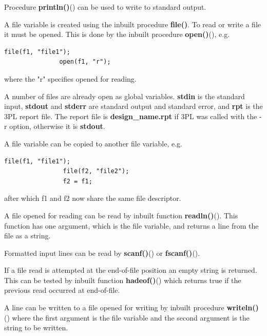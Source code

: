             Procedure {\bf println()}() can be used
            to write to standard output.

            A file variable is created using the inbuilt procedure {\bf file()}.
            To read or write a file it must be opened. This is done by the
            inbuilt procedure {\bf open()}(), e.g.
            \begin{lstlisting}[gobble=12, language=threepl]
               file(f1, "file1");
               open(f1, "r");
            \end{lstlisting}
            where the "r" specifies opened for reading.           
                    
            A number of files are already open as global variables. {\bf stdin} is the
            standard input, {\bf stdout} and {\bf stderr} are standard output and standard
            error, and {\bf rpt} is the 3PL report file. The report file is {\bf
            design\_name.rpt} if 3PL was called with the -r option, otherwise it is {\bf
            stdout}.
            
            A file variable can be copied to another file variable, e.g.
            \begin{lstlisting}[gobble=12, language=threepl]
                file(f1, "file1");
                file(f2, "file2");
                f2 = f1;
            \end{lstlisting}
            after which f1 and f2 now share the same file descriptor.
            
            A file opened for reading can be read by inbuilt function {\bf
            readln()}(). This function has one argument,
            which is the file variable, and returns a line from the file as a
            string.
            
            Formatted input lines can be read by
            {\bf scanf()}()
            or {\bf fscanf()}().
            
            If a file read is attempted at the end-of-file position an empty string
            is returned. This can be tested by inbuilt function
            {\bf hadeof()}() which returns true if the
            previous read occurred at end-of-file.
            
            A line can be written to a file opened for writing by
            inbuilt procedure {\bf writeln()}() where the
            first argument is the file variable and the second argument is the
            string to be written.
            
